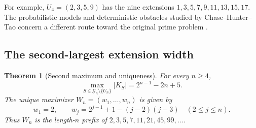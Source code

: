 \documentclass[11pt,a4paper]{article}
\newtheorem{theorem}{Theorem}[section]
\theoremstyle{definition}
\theoremstyle{remark}
\numberwithin{equation}{section}
\begin{document}
For example, $U_4=(2,3,5,9)$ has the nine extensions
$1,3,5,7,9,11,13,15,17$. The probabilistic models and deterministic
obstacles studied by Chase--Hunter--Tao concern a different route
toward the original prime problem \cite{R004}.

\subsection{The second-largest extension width}
\label{A:sec:gilbreathsecond}

\begin{theorem}[Second maximum and uniqueness]\label{A:thm:gilbreath-second}
For every $n\ge4$,
\[
 \max_{S\in\mathcal G_n\setminus\{U_n\}}|K_S|
       =2^{n-1}-2n+5.
\]
The unique maximizer $W_n=(w_1,\ldots,w_n)$ is given by
\[
 w_1=2,\qquad
 w_j=2^{j-1}+1-(j-2)(j-3)\quad(2\le j\le n).
\]
Thus $W_n$ is the length-$n$ prefix of
$2,3,5,7,11,21,45,99,\ldots$.
\end{theorem}
\end{document}
